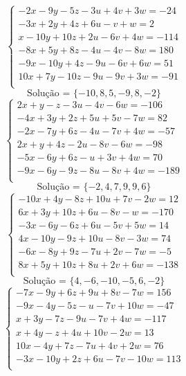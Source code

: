 \documentclass[12pt,oneside,a4paper]{article}
\begin{document}
\vspace{\baselineskip}
\begin{equation*}
\begin{cases}
-2x-9y-5z-3u+4v+3w=-24 \\
-3x+2y+4z+6u-v+w=2 \\
x-10y+10z+2u-6v+4w=-114 \\
-8x+5y+8z-4u-4v-8w=180 \\
-9x-10y+4z-9u-6v+6w=51 \\
10x+7y-10z-9u-9v+3w=-91 \\
\end{cases}
\end{equation*}
\begin{equation*}
\text{Solução = }\{-10,8,5,-9,8,-2\}
\end{equation*}
\vspace{\baselineskip}
\begin{equation*}
\begin{cases}
2x+y-z-3u-4v-6w=-106 \\
-4x+3y+2z+5u+5v-7w=82 \\
-2x-7y+6z-4u-7v+4w=-57 \\
2x+y+4z-2u-8v-6w=-98 \\
-5x-6y+6z-u+3v+4w=70 \\
-9x-6y-9z-8u-8v+4w=-189 \\
\end{cases}
\end{equation*}
\begin{equation*}
\text{Solução = }\{-2,4,7,9,9,6\}
\end{equation*}
\vspace{\baselineskip}
\begin{equation*}
\begin{cases}
-10x+4y-8z+10u+7v-2w=12 \\
6x+3y+10z+6u-8v-w=-170 \\
-3x-6y-6z+6u-5v+5w=14 \\
4x-10y-9z+10u-8v-3w=74 \\
-6x-8y+9z-7u+2v-7w=-5 \\
8x+5y+10z+8u+2v+6w=-138 \\
\end{cases}
\end{equation*}
\begin{equation*}
\text{Solução = }\{4,-6,-10,-5,6,-2\}
\end{equation*}
\vspace{\baselineskip}
\begin{equation*}
\begin{cases}
-7x-9y+6z+9u+8v-7w=156 \\
-9x-4y-5z-u-7v+10w=-47 \\
x+3y-7z-9u-7v+4w=-117 \\
x+4y-z+4u+10v-2w=13 \\
10x-4y+7z-7u+4v+2w=76 \\
-3x-10y+2z+6u-7v-10w=113 \\
\end{cases}
\end{equation*}
\end{document}
